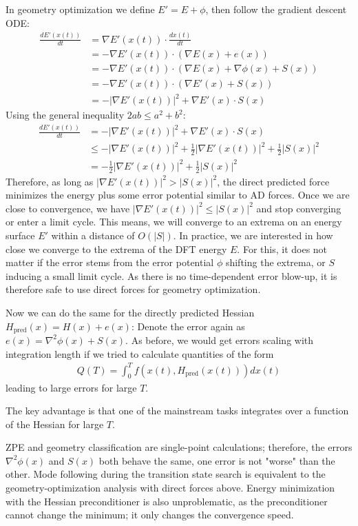 \documentclass[pdflatex,sn-mathphys-num]{sn-jnl}%
\theoremstyle{thmstyleone}%
\theoremstyle{thmstyletwo}%
\theoremstyle{thmstylethree}%
\begin{document}
\begin{appendices}
In geometry optimization we define $E' = E + \phi$, then follow the gradient descent ODE:
\begin{align}
\frac{dE'(x(t))}{dt} &= \nabla E'(x(t)) \cdot \frac{d x(t)}{dt} \\
&= -\nabla E'(x(t)) \cdot (\nabla E(x) + e(x)) \\
&= -\nabla E'(x(t)) \cdot (\nabla E(x) + \nabla\phi(x) + S(x)) \\
&= -\nabla E'(x(t)) \cdot (\nabla E'(x)  + S(x)) \\
&= -|\nabla E'(x(t))|^2 + \nabla E'(x) \cdot S(x)
\end{align}
Using the general inequality $2ab \leq a^2 + b^2$:
\begin{align}
\frac{dE'(x(t))}{dt} &= -|\nabla E'(x(t))|^2 + \nabla E'(x) \cdot S(x) \\
&\leq -|\nabla E'(x(t))|^2 + \frac{1}{2}|\nabla E'(x(t))|^2 + \frac{1}{2}|S(x)|^2 \\
&=-\frac{1}{2}|\nabla E'(x(t))|^2 + \frac{1}{2}|S(x)|^2
\end{align}
Therefore, as long as $|\nabla E'(x(t))|^2 > |S(x)|^2$, the direct predicted force minimizes the energy plus some error potential similar to AD forces. Once we are close to convergence, we have $|\nabla E'(x(t))|^2 \leq |S(x)|^2$ and stop converging or enter a limit cycle. This means, we will converge to an extrema on an energy surface $E'$ within a distance of $O(|S|)$. In practice, we are interested in how close we converge to the extrema of the DFT energy $E$. For this, it does not matter if the error stems from the error potential $\phi$ shifting the extrema, or $S$ inducing a small limit cycle. 
As there is no time-dependent error blow-up, it is therefore safe to use direct forces for geometry optimization. 

Now we can do the same for the directly predicted Hessian $H_\text{pred}(x) = H(x) + e(x)$:
Denote the error again as $e(x) = \nabla^2\phi(x) + S(x)$. 
As before, we would get errors scaling with integration length if we tried to calculate quantities of the form
\begin{align}
Q(T) = \int_0^T f(x(t),  H_\text{pred}(x(t))) dx(t)
\end{align}
leading to large errors for large $T$. 

The key advantage is that one of the mainstream tasks integrates over a function of the Hessian for large $T$.

ZPE and geometry classification are single-point calculations; therefore, the errors $\nabla^2\phi(x)$ and $S(x)$ both behave the same, one error is not "worse" than the other. 
Mode following during the transition state search is equivalent to the geometry-optimization analysis with direct forces above. Energy minimization with the Hessian preconditioner is also unproblematic, as the preconditioner cannot change the minimum; it only changes the convergence speed. 


\end{appendices}
\end{document}
